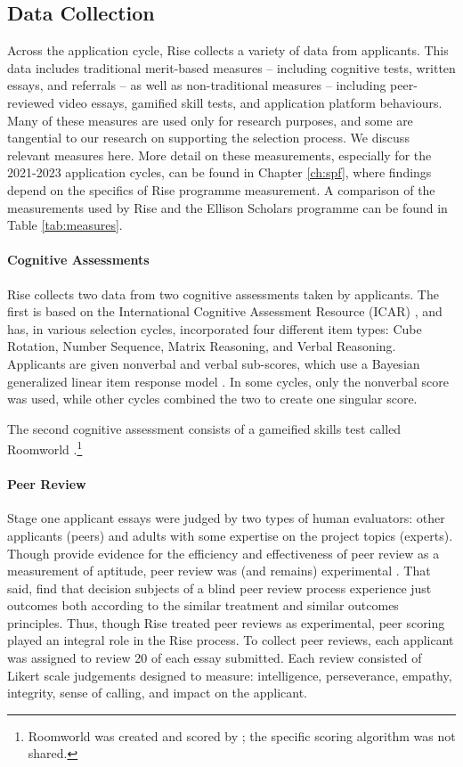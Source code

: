 \subsection{Data Collection}
Across the application cycle, Rise collects a variety of data from applicants. This data includes traditional merit-based measures – including cognitive tests, written essays, and referrals – as well as non-traditional measures – including peer-reviewed video essays, gamified skill tests, and application platform behaviours. Many of these measures are used only for research purposes, and some are tangential to our research on supporting the selection process. We discuss relevant measures here. More detail on these measurements, especially for the 2021-2023 application cycles, can be found in Chapter \ref{ch:spf}, where findings depend on the specifics of Rise programme measurement. A comparison of the measurements used by Rise and the Ellison Scholars programme can be found in Table \ref{tab:measures}.

\paragraph{Cognitive Assessments}
Rise collects two data from two cognitive assessments taken by applicants. The first is based on the International Cognitive Assessment Resource (ICAR) \cite{condon2014international, subotic2020psychometric}, and has, in various selection cycles, incorporated four different item types: Cube Rotation, Number Sequence, Matrix Reasoning, and Verbal Reasoning. Applicants are given nonverbal and verbal sub-scores, which use a Bayesian generalized linear item response model \cite{burkner2021bayesian}. In some cycles, only the nonverbal score was used, while other cycles combined the two to create one singular score.

The second cognitive assessment consists of a gameified skills test called Roomworld \cite{Dumbalska_Bhatti_Ali_Summerfield_2023}.\footnote{Roomworld was created and scored by \textcite{Dumbalska_Bhatti_Ali_Summerfield_2023}; the specific scoring algorithm was not shared.}

\paragraph{Peer Review}
Stage one applicant essays were judged by two types of human evaluators: other applicants (peers) and adults with some expertise on the project topics (experts). Though \textcite{Anvari2021EffectivenessOP} provide evidence for the efficiency and effectiveness of peer review as a measurement of aptitude, peer review was (and remains) experimental \cite{Rahmatillah2022AnalyzingFA}. That said, \textcite{VanderSchee2022UsingCP} find that decision subjects of a blind peer review process experience just outcomes both according to the similar treatment and similar outcomes principles. Thus, though Rise treated peer reviews as experimental, peer scoring played an integral role in the Rise process. To collect peer reviews, each applicant was assigned to review 20 of each essay submitted. Each review consisted of Likert scale judgements designed to measure: intelligence, perseverance, empathy, integrity, sense of calling, and impact on the applicant.

